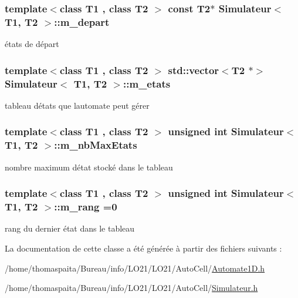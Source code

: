 \subsubsection[{\texorpdfstring{m\+\_\+depart}{m_depart}}]{\setlength{\rightskip}{0pt plus 5cm}template$<$class T1 , class T2 $>$ const T2$\ast$ {\bf Simulateur}$<$ T1, T2 $>$\+::m\+\_\+depart\hspace{0.3cm}{\ttfamily [private]}}\hypertarget{class_simulateur_a8f024dcb44d5688aac1fdbc7df531104}{}\label{class_simulateur_a8f024dcb44d5688aac1fdbc7df531104}
états de départ 
\subsubsection[{\texorpdfstring{m\+\_\+etats}{m_etats}}]{\setlength{\rightskip}{0pt plus 5cm}template$<$class T1 , class T2 $>$ std\+::vector$<$T2 $\ast$$>$ {\bf Simulateur}$<$ T1, T2 $>$\+::m\+\_\+etats\hspace{0.3cm}{\ttfamily [private]}}\hypertarget{class_simulateur_a9156b165b5affe1b4627ff66802cfc99}{}\label{class_simulateur_a9156b165b5affe1b4627ff66802cfc99}
tableau d\textquotesingle{}états que l\textquotesingle{}automate peut gérer 
\subsubsection[{\texorpdfstring{m\+\_\+nb\+Max\+Etats}{m_nbMaxEtats}}]{\setlength{\rightskip}{0pt plus 5cm}template$<$class T1 , class T2 $>$ unsigned int {\bf Simulateur}$<$ T1, T2 $>$\+::m\+\_\+nb\+Max\+Etats\hspace{0.3cm}{\ttfamily [private]}}\hypertarget{class_simulateur_aee6fbe615a412a23aafe23d5b6487eec}{}\label{class_simulateur_aee6fbe615a412a23aafe23d5b6487eec}
nombre maximum d\textquotesingle{}état stocké dans le tableau 
\subsubsection[{\texorpdfstring{m\+\_\+rang}{m_rang}}]{\setlength{\rightskip}{0pt plus 5cm}template$<$class T1 , class T2 $>$ unsigned int {\bf Simulateur}$<$ T1, T2 $>$\+::m\+\_\+rang =0\hspace{0.3cm}{\ttfamily [private]}}\hypertarget{class_simulateur_a40f39f55c107779de9c1b4418b98f7c0}{}\label{class_simulateur_a40f39f55c107779de9c1b4418b98f7c0}
rang du dernier état dans le tableau 

La documentation de cette classe a été générée à partir des fichiers suivants \+:\begin{DoxyCompactItemize}
\item 
/home/thomaspaita/\+Bureau/info/\+L\+O21/\+L\+O21/\+Auto\+Cell/\hyperlink{_automate1_d_8h}{Automate1\+D.\+h}\item 
/home/thomaspaita/\+Bureau/info/\+L\+O21/\+L\+O21/\+Auto\+Cell/\hyperlink{_simulateur_8h}{Simulateur.\+h}\end{DoxyCompactItemize}
